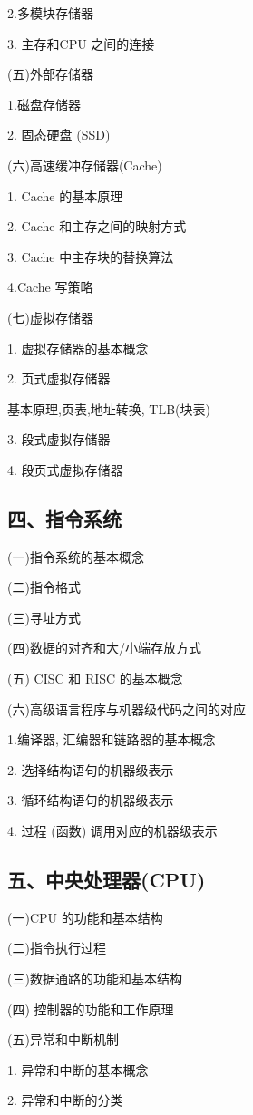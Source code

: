 \documentclass[10pt]{article}
\begin{document}
2.多模块存储器

3. 主存和CPU 之间的连接

{\color{red} (五)外部存储器

1.磁盘存储器

2. 固态硬盘 (SSD)}

(六)高速缓冲存储器(Cache)

1. Cache 的基本原理

2. Cache 和主存之间的映射方式

3. Cache 中主存块的替换算法

4.Cache 写策略

(七)虚拟存储器

1. 虚拟存储器的基本概念

2. 页式虚拟存储器

基本原理,页表,地址转换, TLB(块表)

3. 段式虚拟存储器

4. 段页式虚拟存储器

\subsection*{四、指令系统}

(一)指令系统的基本概念

(二)指令格式

(三)寻址方式

{\color{red} (四)数据的对齐和大/小端存放方式}

(五) CISC 和 RISC 的基本概念

{\color{red} (六)高级语言程序与机器级代码之间的对应

1.编译器, 汇编器和链路器的基本概念

2. 选择结构语句的机器级表示

3. 循环结构语句的机器级表示

4. 过程 (函数) 调用对应的机器级表示}

\subsection*{五、中央处理器(CPU)}

(一)CPU 的功能和基本结构

(二)指令执行过程

(三)数据通路的功能和基本结构

(四) 控制器的功能和工作原理

(五)异常和中断机制

1. 异常和中断的基本概念

2. 异常和中断的分类
\end{document}
